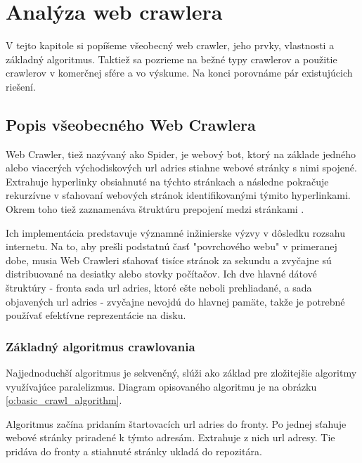 

\chapter{Analýza web crawlera}
V tejto kapitole si popíšeme všeobecný web crawler, jeho prvky, vlastnosti a základný algoritmus. Taktiež sa pozrieme na bežné typy crawlerov a použitie crawlerov v komerčnej sfére a vo výskume. Na konci porovnáme pár existujúcich riešení.

\section{Popis všeobecného Web Crawlera}

Web Crawler, tiež nazývaný ako Spider, je webový bot, ktorý na základe jedného alebo viacerých východiskových \acrshort{url} adries stiahne webové stránky s nimi spojené. Extrahuje hyperlinky obsiahnuté na týchto stránkach a následne pokračuje rekurzívne v sťahovaní webových stránok identifikovanými týmito hyperlinkami. Okrem toho tiež zaznamenáva štruktúru prepojení medzi stránkami \cite{introToInfRetrieval}.

Ich implementácia predstavuje významné inžinierske výzvy v dôsledku rozsahu internetu. Na to, aby prešli podstatnú časť "povrchového webu" v primeranej dobe, musia Web Crawleri sťahovať tisíce stránok za sekundu a zvyčajne sú distribuované na desiatky alebo stovky počítačov. Ich dve hlavné dátové štruktúry - fronta sada \acrshort{url}  adries, ktoré ešte neboli prehliadané, a sada objavených \acrshort{url}  adries - zvyčajne nevojdú do hlavnej pamäte, takže je potrebné používať efektívne reprezentácie na disku. \cite{encykOfDatabases}

\subsection{Základný algoritmus crawlovania}\label{sub:zakladnyAlgoritmusCrawlovania}
Najjednoduchší algoritmus je sekvenčný, slúži ako základ pre zložitejšie algoritmy využívajúce paralelizmus. Diagram opisovaného algoritmu je na obrázku \ref{o:basic_crawl_algorithm}.

Algoritmus začína pridaním štartovacích \acrshort{url}  adries do fronty. Po jednej sťahuje webové stránky priradené k týmto adresám. Extrahuje z nich \acrshort{url}  adresy. Tie pridáva do fronty a stiahnuté stránky ukladá do repozitára.

